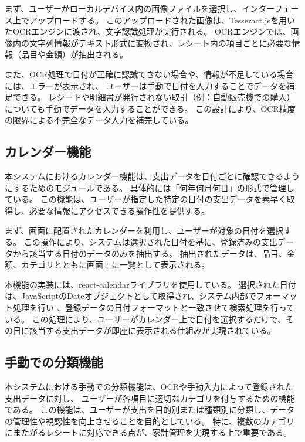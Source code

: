 \documentclass[main]{subfiles}
\begin{document}
まず、ユーザーがローカルデバイス内の画像ファイルを選択し、インターフェース上でアップロードする。
このアップロードされた画像は、Tesseract.jsを用いたOCRエンジンに渡され、文字認識処理が実行される。
OCRエンジンでは、画像内の文字列情報がテキスト形式に変換され、レシート内の項目ごとに必要な情報（品目や金額）が抽出される。

また、OCR処理で日付が正確に認識できない場合や、情報が不足している場合には、エラーが表示され、
ユーザーは手動で日付を入力することでデータを補足できる。
レシートや明細書が発行されない取引（例：自動販売機での購入）についても手動でデータを入力することができる。
この設計により、OCR精度の限界による不完全なデータ入力を補完している。
\subsection{カレンダー機能}

本システムにおけるカレンダー機能は、支出データを日付ごとに確認できるようにするためのモジュールである。
具体的には「何年何月何日」の形式で管理している。
この機能は、ユーザーが指定した特定の日付の支出データを素早く取得し、必要な情報にアクセスできる操作性を提供する。

まず、画面に配置されたカレンダーを利用し、ユーザーが対象の日付を選択する。
この操作により、システムは選択された日付を基に、登録済みの支出データから該当する日付のデータのみを抽出する。
抽出されたデータは、品目、金額、カテゴリとともに画面上に一覧として表示される。

本機能の実装には、react-calendarライブラリを使用している。
選択された日付は、JavaScriptのDateオブジェクトとして取得され、システム内部でフォーマット処理を行い
、登録データの日付フォーマットと一致させて検索処理を行っている。
この処理により、ユーザーがカレンダー上で日付を選択するだけで、その日に該当する支出データが即座に表示される仕組みが実現されている。
\subsection{手動での分類機能}

本システムにおける手動での分類機能は、OCRや手動入力によって登録された支出データに対し、
ユーザーが各項目に適切なカテゴリを付与するための機能である。
この機能は、ユーザーが支出を目的別または種類別に分類し、データの管理性や視認性を向上させることを目的としている。
特に、複数のカテゴリにまたがるレシートに対応できる点が、家計管理を実現する上で重要である。
\end{document}

